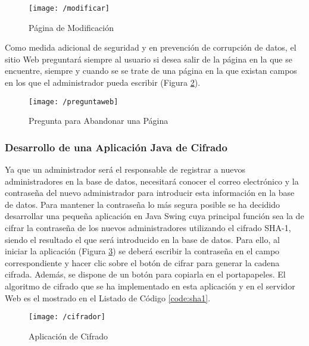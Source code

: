 \begin{figure}[!h]
	\begin{center}
		\texttt{[image: /modificar]}
		\caption{Página de Modificación}
		\label{fig:modificar}
	\end{center}
\end{figure}

Como medida adicional de seguridad y en prevención de corrupción de datos, el sitio Web preguntará siempre al usuario si desea salir de la página en la que se encuentre, siempre y cuando se se trate de una página en la que existan campos en los que el administrador pueda escribir (Figura \ref{fig:preguntaweb}).

\begin{figure}[!h]
	\begin{center}
		\texttt{[image: /preguntaweb]}
		\caption{Pregunta para Abandonar una Página}
		\label{fig:preguntaweb}
	\end{center}
\end{figure}

\clearpage

\subsubsection{Desarrollo de una Aplicación Java de Cifrado}
Ya que un administrador será el responsable de registrar a nuevos administradores en la base de datos, necesitará conocer el correo electrónico y la contraseña del nuevo administrador para introducir esta información en la base de datos. Para mantener la contraseña lo más segura posible se ha decidido desarrollar una pequeña aplicación en Java Swing cuya principal función sea la de cifrar la contraseña de los nuevos administradores utilizando el cifrado SHA-1, siendo el resultado el que será introducido en la base de datos. Para ello, al iniciar la aplicación (Figura \ref{fig:cifrador}) se deberá escribir la contraseña en el campo correspondiente y hacer clic sobre el botón de cifrar para generar la cadena cifrada. Además, se dispone de un botón para copiarla en el portapapeles. El algoritmo de cifrado que se ha implementado en esta aplicación y en el servidor Web es el mostrado en el Listado de Código \ref{code:sha1}.

\begin{figure}[!h]
	\begin{center}
		\texttt{[image: /cifrador]}
		\caption{Aplicación de Cifrado}
		\label{fig:cifrador}
	\end{center}
\end{figure}


